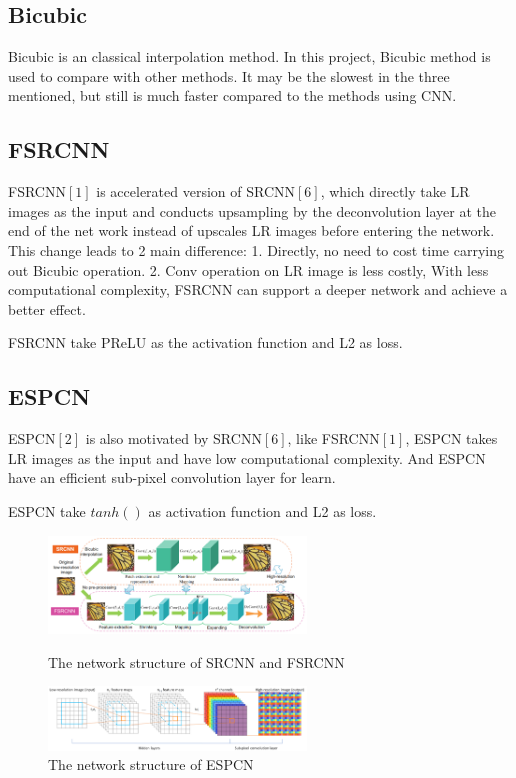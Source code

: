 \documentclass{article}
\begin{document}
  \subsection{Bicubic}
  Bicubic is an classical interpolation method. In this project, Bicubic method is used to compare with other methods.
  It may be the slowest in the three mentioned, but still is much faster compared to the methods using CNN.
  
  \subsection{FSRCNN} 
  FSRCNN$[1]$ is accelerated version of SRCNN$[6]$, 
  which directly take LR images as the input and conducts upsampling by the deconvolution layer at the end of the net work instead of upscales LR images before entering the network. 
  This change leads to 2 main difference: 1. Directly, no need to cost time carrying out Bicubic operation. 
  2. Conv operation on LR image is less costly, With less computational complexity, 
  FSRCNN can support a deeper network and achieve a better effect.
  
  FSRCNN take PReLU as the activation function and L2 as loss.


  \subsection{ESPCN}
  ESPCN$[2]$ is also motivated by SRCNN$[6]$, like FSRCNN$[1]$, 
  ESPCN takes LR images as the input and have low computational complexity. 
  And ESPCN have an efficient sub-pixel convolution layer for learn.
  
  ESPCN take $tanh()$ as activation function and L2 as loss.

  \begin{figure}[H]
    \begin{minipage}[H]{0.5\linewidth}
    \centering
    \includegraphics[width=2.7in]{images/FSRCNN.png}
    \caption{The network structure of SRCNN and FSRCNN}

    \end{minipage}
    \begin{minipage}[H]{0.5\linewidth}
    \centering
    \includegraphics[width=2.7in]{images/ESPCN.png}
    \caption{The network structure of ESPCN}

    \end{minipage}
\end{figure}
\end{document}
